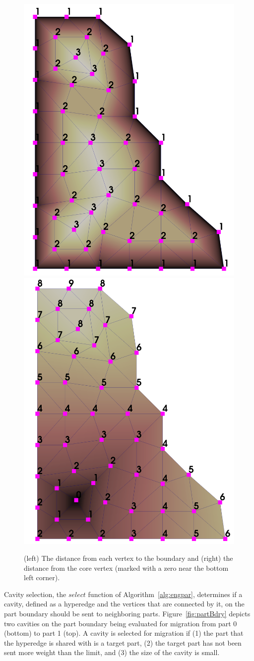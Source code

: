 \documentclass[graybox]{svmult}
\begin{document}
\begin{figure}
  \centering
  \label{fig:distQueue}
  \includegraphics[width=.4\textwidth]{images/2dTreeDepth.png}
  \includegraphics[width=.41\textwidth]{images/2dDistance.png}
  \caption{
    (left) The distance from each vertex to the boundary and (right) the
    distance from the core vertex (marked with a zero near the
    bottom left corner).~\cite{SmithParma2015}
  }
\end{figure}

Cavity selection, the $select$ function of Algorithm~\ref{alg:engpar},
determines if a cavity, defined as a hyperedge and the vertices that are
connected by it, on the part boundary should be sent to neighboring parts.
Figure~\ref{fig:partBdry} depicts two cavities on the part boundary being
evaluated for migration from part 0 (bottom) to part 1 (top).
A cavity is selected for migration if (1) the part that the hyperedge is shared
with is a target part, (2) the target part has not been sent more weight than
the limit, and (3) the size of the cavity is small.
\end{document}
